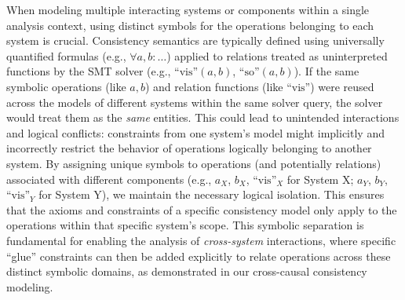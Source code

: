 When modeling multiple interacting systems or components within a single
analysis context, using distinct symbols for the operations belonging to each
system is crucial. Consistency semantics are typically defined using universally
quantified formulas (e.g., $\forall a, b: \dots$) applied to
relations treated as
uninterpreted functions by the SMT solver (e.g., $\text{``vis''}(a,
b)$, $\text{``so''}(a, b)$).
If the same symbolic operations (like $a, b$) and relation functions
(like $\text{``vis''}$)
were reused across the models of different systems within the same solver query,
the solver would treat them as the \textit{same} entities. This could lead to
unintended interactions and logical conflicts: constraints from one system's
model might implicitly and incorrectly restrict the behavior of operations
logically belonging to another system. By assigning unique symbols to operations
(and potentially relations) associated with different components
(e.g., $a_X$, $b_X$, $\text{``vis''}_X$ for
System X; $a_Y$, $b_Y$, $\text{``vis''}_Y$ for System Y), we maintain
the necessary
logical isolation. This ensures that the axioms and constraints of a specific
consistency model only apply to the operations within that specific system's
scope. This symbolic separation is fundamental for enabling the analysis of
\textit{cross-system} interactions, where specific ``glue''
constraints can then be added
explicitly to relate operations across these distinct symbolic domains, as
demonstrated in our cross-causal consistency modeling.

%
%
%

